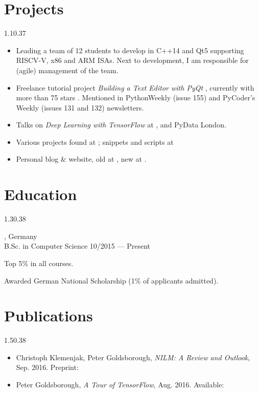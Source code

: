 \section{Projects}{1.1}{0.37}
\vspace{-4mm}
\begin{itemize}
  \item Leading a team of 12 students to develop  in C++14 and Qt5 supporting RISCV-V, x86 and ARM ISAs. Next to development, I am responsible for (agile) management of the team.
	\item Freelance tutorial project \emph{Building a Text Editor with
      PyQt} , currently with
    more than 75 stars . Mentioned in PythonWeekly (issue 155) and PyCoder's Weekly (issues 131 and 132) newsletters.
  \item Talks on \emph{Deep Learning with TensorFlow} at ,  and PyData London.
  \item Various projects found at
	; snippets and scripts at 
	\item Personal blog \& website, old at , new at .
\end{itemize}

\vspace{-2mm}
\section{Education}{1.3}{0.38}
\begin{entry}
	{, Germany}
	{\\B.Sc. in Computer Science}
	{10/2015 --- Present}
  \item Top 5\% in all courses.
  \item Awarded German National Scholarship (1\% of applicants admitted).
\end{entry}

\section{Publications}{1.5}{0.38}
\vspace{-2mm}
\begin{itemize}
  \item Christoph Klemenjak, Peter Goldsborough, \emph{NILM: A Review and Outlook}, Sep. 2016. Preprint: 
  \item Peter Goldsborough, \emph{A Tour of TensorFlow}, Aug. 2016. Available: 
\end{itemize}


